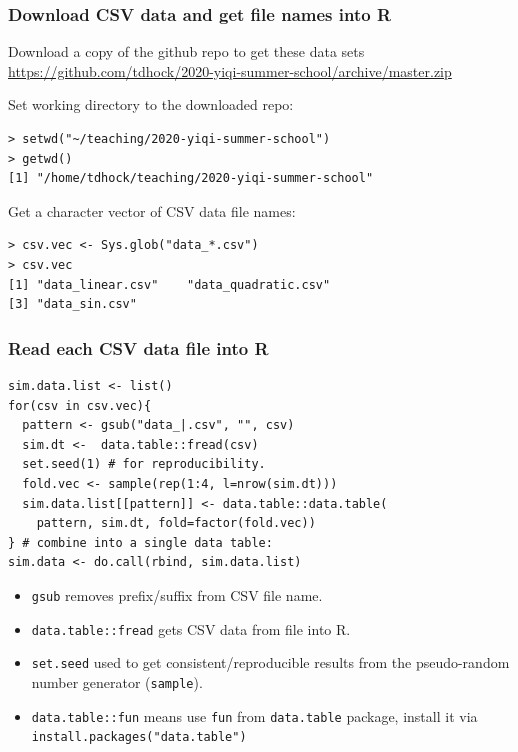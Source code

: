 \documentclass{beamer}
\begin{document}
\begin{frame}
  \frametitle{Download CSV data and get file names into R}

  Download a copy of the github repo to get these data sets
  \url{https://github.com/tdhock/2020-yiqi-summer-school/archive/master.zip}

Set working directory to the downloaded repo:

\begin{verbatim}
> setwd("~/teaching/2020-yiqi-summer-school")
> getwd()
[1] "/home/tdhock/teaching/2020-yiqi-summer-school"
\end{verbatim}

  Get a character vector of CSV data file names:
  
\begin{verbatim}
> csv.vec <- Sys.glob("data_*.csv")
> csv.vec
[1] "data_linear.csv"    "data_quadratic.csv"
[3] "data_sin.csv"      
\end{verbatim}

\end{frame}

\begin{frame}
  \frametitle{Read each CSV data file into R}
\begin{verbatim}
sim.data.list <- list()
for(csv in csv.vec){
  pattern <- gsub("data_|.csv", "", csv)
  sim.dt <-  data.table::fread(csv)
  set.seed(1) # for reproducibility.
  fold.vec <- sample(rep(1:4, l=nrow(sim.dt)))
  sim.data.list[[pattern]] <- data.table::data.table(
    pattern, sim.dt, fold=factor(fold.vec))
} # combine into a single data table:
sim.data <- do.call(rbind, sim.data.list)
\end{verbatim}

  \begin{itemize}
  \item \texttt{gsub} removes prefix/suffix from CSV file name.
  \item \texttt{data.table::fread} gets CSV data from file into R.
  \item \texttt{set.seed} used to get consistent/reproducible results from the
    pseudo-random number generator (\texttt{sample}).
  \item \texttt{data.table::fun} means use \texttt{fun} from
    \texttt{data.table} package, install it via
    \texttt{install.packages("data.table")}
  \end{itemize}
\end{frame}
\end{document}
